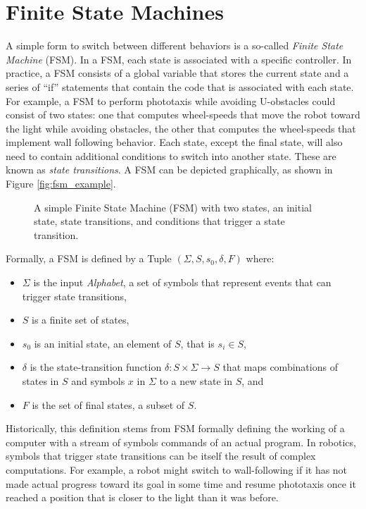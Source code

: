 \section{Finite State Machines}\label{sec:fsm}
A simple form to switch between different behaviors is a so-called \emph{Finite State Machine} (FSM). In a FSM, each state is associated with a specific controller. In practice, a FSM consists of a global variable that stores the current state and a series of ``if'' statements that contain the code that is associated with each state. For example, a FSM to perform phototaxis while avoiding U-obstacles could consist of two states: one that computes wheel-speeds that move the robot toward the light while avoiding obstacles, the other that computes the wheel-speeds that implement wall following behavior. Each state, except the final state, will also need to contain additional conditions to switch into another state. These are known as \emph{state transitions}. A FSM can be depicted graphically, as shown in Figure \ref{fig:fsm_example}.

\begin{figure}
\caption{A simple Finite State Machine (FSM) with two states, an initial state, state transitions, and conditions that trigger a state transition.}
\end{figure}

Formally, a FSM is defined by a Tuple $(\Sigma, S, s_0, \delta, F)$ where:
\begin{itemize}
\item $\Sigma$ is the input \emph{Alphabet}, a set of symbols that represent events that can trigger state transitions,
\item $S$ is a finite set of states,
\item $s_0$ is an initial state, an element of $S$, that is $s_i \in S$,
\item $\delta$ is the state-transition function $\delta: S \times \Sigma \rightarrow S$ that maps combinations of states in $S$ and symbols $x$ in $\Sigma$ to a new state in $S$, and
\item $F$ is the set of final states, a subset of $S$. 
\end{itemize}

Historically, this definition stems from FSM formally defining the working of a computer with a stream of symbols commands of an actual program. In robotics, symbols that trigger state transitions can be itself the result of complex computations. For example, a robot might switch to wall-following if it has not made actual progress toward its goal in some time and resume phototaxis once it reached a position that is closer to the light than it was before. 

